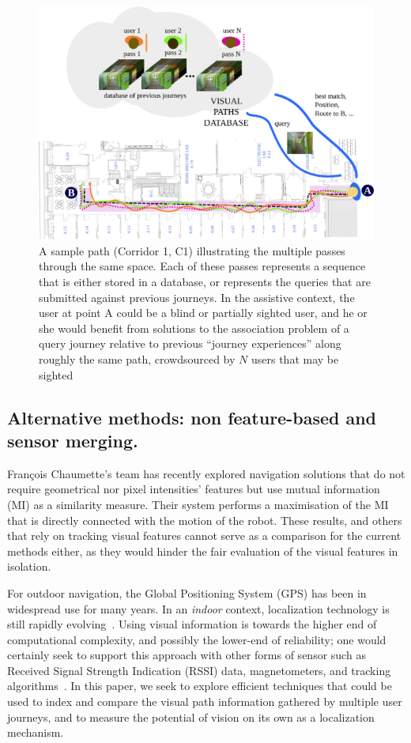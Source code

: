 \begin{figure}[t]

\begin{center}
\includegraphics[width=\linewidth]{./gfx/Chapter04/corridor.pdf}
\caption{ A sample path (Corridor 1, C1) illustrating the multiple passes through the same space. Each of these passes represents a sequence that is either stored in a database, or represents the queries that are submitted against previous journeys. In the assistive context, the user at point A could be a blind or partially sighted user, and he or she would benefit from solutions to the association problem of a query journey relative to previous ``journey experiences'' along roughly the same path, crowdsourced by $N$ users that may be sighted}
\label{fig:visualpaths}
\end{center}
\end{figure}

\subsection{Alternative methods: non feature-based and sensor merging.} 
Fran\c{c}ois Chaumette's team has  recently explored navigation solutions that do not require geometrical nor pixel intensities' features but use mutual information (MI) as a similarity measure. Their system performs a maximisation of the MI that is directly connected with the motion of the robot. These results, and others that rely on tracking visual features \cite{Se2002} cannot serve as a comparison for the current methods either, as they would hinder the fair evaluation of the visual features in isolation.

For outdoor navigation, the Global Positioning System (GPS) has been in widespread use for many years.  In an {\it indoor} context, localization technology is still rapidly evolving~\cite{Shen,Wang2012,Quigley2010}.  Using visual information is towards the higher end of computational complexity, and possibly the lower-end of reliability; one would certainly seek to support this approach with other forms of sensor such as Received Signal Strength Indication (RSSI) data, magnetometers, and tracking algorithms~\cite{Schroth2011,Schroth2012,Quigley2010}.  In this paper, we seek to explore efficient techniques that could be used to index and compare the visual path information gathered by multiple user journeys, and to measure the potential of vision on its own as a localization mechanism. 
%
